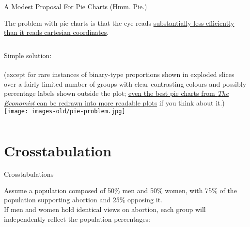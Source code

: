\documentclass[t]{beamer}
\begin{document}
	
	\begin{frame}[t]{A Modest Proposal For Pie Charts (Hmm. Pie.)}

		The problem with pie charts is that the eye reads  \href{http://en.wikipedia.org/wiki/Pie_chart}{substantially less efficiently than it reads cartesian coordinates}.\\[1em]

		\begin{columns}[T]
			Simple solution:\\
			\\[4.75em]
			\tiny{(except for rare instances of binary-type proportions shown in exploded slices over a fairly limited number of groups with clear contrasting colours and possibly percentage labels shown outside the plot; \href{http://andrewgelman.com/2011/04/one_more_time-u/}{even the best pie charts from \textit{The Economist} can be redrawn into more readable plots} if you think about it.)}
			\texttt{[image: images-old/pie-problem.jpg]}
		\end{columns}

	\end{frame}
	
	
	
	
	\section{Crosstabulation}

	\begin{frame}[t]{Crosstabulations}
	
	Assume a population composed of 50\% men and 50\% women, with 75\% of the population supporting abortion and 25\% opposing it.\\[1em]

	If men and women hold identical views on abortion, each group will independently reflect the population percentages:\\[1em]
		

		
	\end{frame}
	
\end{document}
